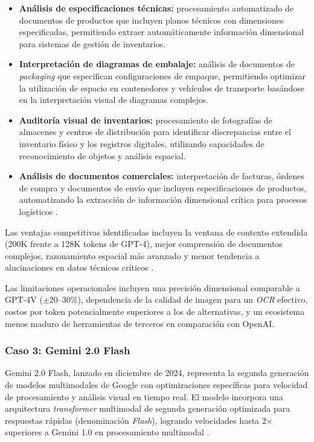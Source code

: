 \begin{itemize}
    \item \textbf{Análisis de especificaciones técnicas:} procesamiento automatizado de documentos de productos que incluyen planos técnicos con dimensiones especificadas, permitiendo extraer automáticamente información dimensional para sistemas de gestión de inventarios.
    \item \textbf{Interpretación de diagramas de embalaje:} análisis de documentos de \textit{packaging} que especifican configuraciones de empaque, permitiendo optimizar la utilización de espacio en contenedores y vehículos de transporte basándose en la interpretación visual de diagramas complejos.
    \item \textbf{Auditoría visual de inventarios:} procesamiento de fotografías de almacenes y centros de distribución para identificar discrepancias entre el inventario físico y los registros digitales, utilizando capacidades de reconocimiento de objetos y análisis espacial.
    \item \textbf{Análisis de documentos comerciales:} interpretación de facturas, órdenes de compra y documentos de envío que incluyen especificaciones de productos, automatizando la extracción de información dimensional crítica para procesos logísticos \cite{Anthropic2024}.
\end{itemize}

Las ventajas competitivas identificadas incluyen la ventana de contexto extendida (200K frente a 128K tokens de GPT-4), mejor comprensión de documentos complejos, razonamiento espacial más avanzado y menor tendencia a alucinaciones en datos técnicos críticos \cite{Anthropic2024}.

Las limitaciones operacionales incluyen una precisión dimensional comparable a GPT-4V ($\pm$20--30\%), dependencia de la calidad de imagen para un \textit{OCR} efectivo, costos por token potencialmente superiores a los de alternativas, y un ecosistema menos maduro de herramientas de terceros en comparación con OpenAI.


\subsubsection{Caso 3: Gemini 2.0 Flash}

Gemini 2.0 Flash, lanzado en diciembre de 2024, representa la segunda generación de modelos multimodales de Google con optimizaciones específicas para velocidad de procesamiento y análisis visual en tiempo real. El modelo incorpora una arquitectura \textit{transformer} multimodal de segunda generación optimizada para respuestas rápidas (denominación \textit{Flash}), logrando velocidades hasta 2$\times$ superiores a Gemini 1.0 en procesamiento multimodal \cite{Team20252, Team20251}.

